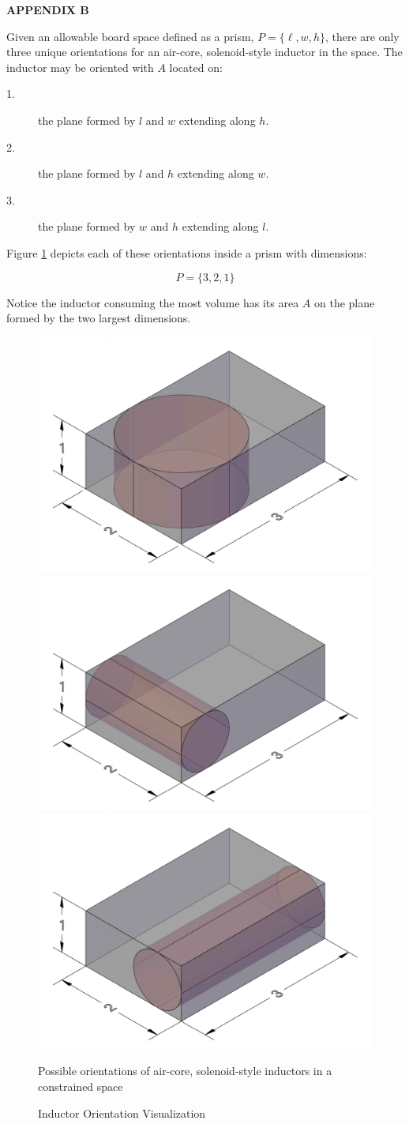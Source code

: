 \centerline{\large\bf APPENDIX B}

\label{appendix:orientation-visualization}
Given an allowable board space defined as a prism, $P = \{\ell, w, h\}$, there are only three unique orientations for an air-core, solenoid-style inductor in the space. The inductor may be oriented with $A$ located on:
\begin{description}
\item[1.] the plane formed by $l$ and $w$ extending along $h$.
\item[2.] the plane formed by $l$ and $h$ extending along $w$.
\item[3.] the plane formed by $w$ and $h$ extending along $l$.
\end{description}

Figure \ref{fig:PossibleOrientations} depicts each of these orientations inside a prism with dimensions:

\begin{equation}\label{eq:PrismSimulation}
P = \{3, 2, 1\} \nonumber
\end{equation}

Notice the inductor consuming the most volume has its area $A$ on the plane formed by the two largest dimensions.

\begin{figure}[!htbp]
    \centering
    \includegraphics[width=0.30\linewidth]{img/xyInductorCropped.pdf}
    \includegraphics[width=0.30\linewidth]{img/xzInductorCropped.pdf}
    \includegraphics[width=0.30\linewidth]{img/yzInductorCropped.pdf}
    \caption{Inductor Orientation Visualization}Possible orientations of air-core, solenoid-style inductors in a constrained space
    \label{fig:PossibleOrientations}
\end{figure}